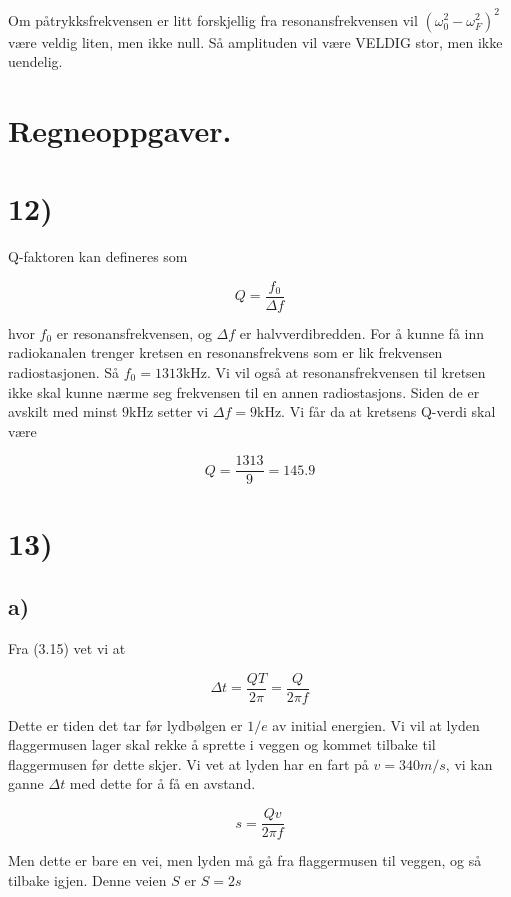 \documentclass[a4paper,norsk, 10pt]{article}
\begin{document}
Om påtrykksfrekvensen er litt forskjellig fra resonansfrekvensen vil $(\omega_0^2 - \omega_F^2)^2$ være veldig liten, men ikke null. Så amplituden vil være VELDIG stor, men ikke uendelig.



\section*{Regneoppgaver.}

\section*{12)}

Q-faktoren kan defineres som

\begin{equation}
Q = \frac{f_0}{\Delta f}
\label{Q}
\end{equation}

hvor $f_0$ er resonansfrekvensen, og $\Delta f$ er halvverdibredden. For å kunne få inn radiokanalen trenger kretsen en resonansfrekvens som er lik frekvensen radiostasjonen. Så $f_0 = 1313 $kHz. Vi vil også at resonansfrekvensen til kretsen ikke skal kunne nærme seg frekvensen til en annen radiostasjons. Siden de er avskilt med minst $9$kHz setter vi $\Delta f = 9$kHz. Vi får da at kretsens Q-verdi skal være

$$
Q = \frac{1313}{9} = 145.9
$$

\section*{13)}

\subsection*{a)}
Fra (3.15) vet vi at

$$
\Delta t = \frac{QT}{2\pi} = \frac{Q}{2\pi f}
$$

Dette er tiden det tar før lydbølgen er $1/e$ av initial energien. Vi vil at lyden flaggermusen lager skal rekke å sprette i veggen og kommet tilbake til flaggermusen før dette skjer. Vi vet at lyden har en fart på $v = 340m/s$, vi kan ganne $\Delta t$ med dette for å få en avstand.

$$
s = \frac{Qv}{2\pi f}
$$

Men dette er bare en vei, men lyden må gå fra flaggermusen til veggen, og så tilbake igjen. Denne veien $S$ er $S = 2s$
\end{document}
